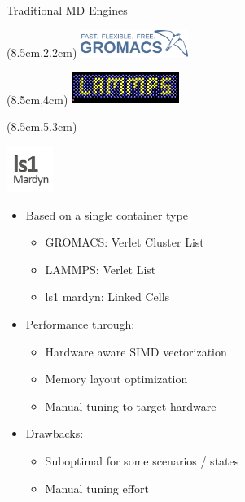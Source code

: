 \documentclass[
	10pt,
	t		%
]{beamer}
\begin{document}
\begin{frame}{Traditional MD Engines}


    \begin{textblock*}{3.5cm}(8.5cm,2.2cm)
        \includegraphics[width=3.5cm]{figures/gromacs-logo.png}
    \end{textblock*}
    \begin{textblock*}{3.5cm}(8.5cm,4cm)
        \includegraphics[width=3.5cm]{figures/lammps-logo.png}
    \end{textblock*}
    \begin{textblock*}{3cm}(8.5cm,5.3cm)
        \begin{center}

            \includegraphics[width=1.5cm]{figures/ls1-logo.png}
        \end{center}
    \end{textblock*}


    \begin{itemize}
        \item Based on a single container type
              \begin{itemize}
                  \item GROMACS: Verlet Cluster List
                  \item LAMMPS: Verlet List
                  \item ls1 mardyn: Linked Cells
              \end{itemize}
        \item Performance through:
              \begin{itemize}
                  \item Hardware aware SIMD vectorization
                  \item Memory layout optimization
                  \item Manual tuning to target hardware
              \end{itemize}
        \item Drawbacks:
              \begin{itemize}
                  \item Suboptimal for some scenarios / states
                  \item Manual tuning effort
              \end{itemize}
    \end{itemize}

\end{frame}
\end{document}

